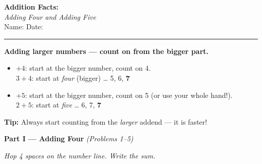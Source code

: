 \documentclass[12pt, letterpaper]{article}
\newcommand{\answerline}{\underline{\hspace{2.5cm}}}
\newcommand{\biganswerline}{\underline{\hspace{4cm}}}
\begin{document}
\begin{center}
  {\LARGE\textbf{\textcolor{scholared}{Addition Facts:}}}\\[4pt]
  {\Large\textcolor{scholagold}{\textit{Adding Four and Adding Five}}}\\[6pt]
  {\small Name: \biganswerline \hspace{1cm} Date: \answerline}
\end{center}

\vspace{4pt}
\noindent\textcolor{scholared}{\rule{\linewidth}{1pt}}
\vspace{4pt}


\begin{lessonbox}
\textbf{Adding larger numbers — count on from the bigger part.}\\[6pt]
\begin{itemize}[leftmargin=1.5em, itemsep=3pt]
  \item \textbf{$+4$}: start at the bigger number, count on 4.\\
    \hspace{1em} $3 + 4$: start at \textit{four} (bigger) … 5, 6, \textbf{7}
  \item \textbf{$+5$}: start at the bigger number, count on 5 (or use your whole hand!).\\
    \hspace{1em} $2 + 5$: start at \textit{five} … 6, 7, \textbf{7} 
\end{itemize}
\medskip
\noindent\textbf{Tip:} Always start counting from the \emph{larger} addend — it is faster!
\end{lessonbox}

\bigskip

\noindent\textcolor{scholared}{\large\textbf{Part I — Adding Four}} \hfill \textit{(Problems 1–5)}

\medskip
\noindent\textit{Hop 4 spaces on the number line. Write the sum.}

\bigskip

\noindent
{}
\end{document}
